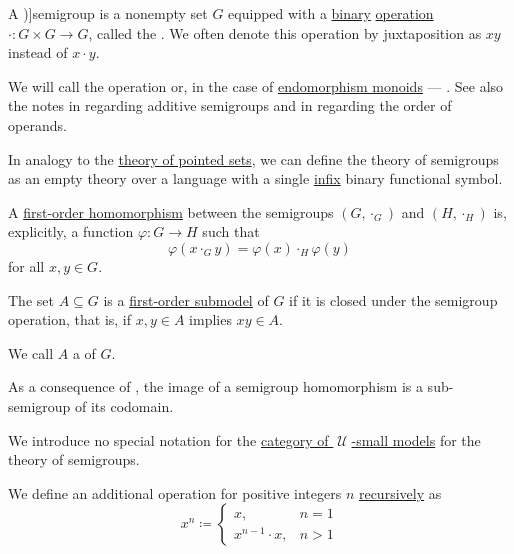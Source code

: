 \begin{definition}\label{def:semigroup}
  A \term[ru=полугруппа (\cite[28]{Ляпин1960})]{semigroup} is a nonempty set \( G \) equipped with a \hyperref[def:operation_arity]{binary} \hyperref[def:operation_on_set]{operation} \( \cdot: G \times G \to G \), called the . We often denote this operation by juxtaposition as \( xy \) instead of \( x \cdot y \).

  We will call the operation  or, in the case of \hyperref[def:endomorphism_monoid]{endomorphism monoids} --- . See also the notes in  regarding additive semigroups and in  regarding the order of operands.

  \begin{thmenum}[series=def:semigroup]
     In analogy to the \hyperref[def:pointed_set/theory]{theory of pointed sets}, we can define the theory of semigroups as an empty theory over a language with a single \hyperref[rem:first_order_formula_conventions/infix]{infix} binary functional symbol.

     A \hyperref[def:first_order_homomorphism]{first-order homomorphism} between the semigroups \( (G, \cdot_{G}) \) and \( (H, \cdot_{H}) \) is, explicitly, a function \( \varphi: G \to H \) such that
    \begin{equation}\label{eq:def:semigroup/homomorphism}
      \varphi(x \cdot_{G} y) = \varphi(x) \cdot_{H} \varphi(y)
    \end{equation}
    for all \( x, y \in G \).

     The set \( A \subseteq G \) is a \hyperref[def:first_order_substructure]{first-order submodel} of \( G \) if it is closed under the semigroup operation, that is, if \( x, y \in A \) implies \( xy \in A \).

    We call \( A \) a  of \( G \).

    As a consequence of , the image of a semigroup homomorphism is a sub-semigroup of its codomain.

     We introduce no special notation for the \hyperref[def:category_of_small_first_order_models]{category of \( \mscrU \)-small models} for the theory of semigroups.

     We define an additional  operation for positive integers \( n \) \hyperref[rem:natural_number_recursion]{recursively} as
    \begin{equation}\label{eq:def:semigroup/exponentiation}
      x^n \coloneqq \begin{cases}
        x,               &n = 1 \\
        x^{n-1} \cdot x, &n > 1
      \end{cases}
    \end{equation}


\end{thmenum}
\end{definition}
